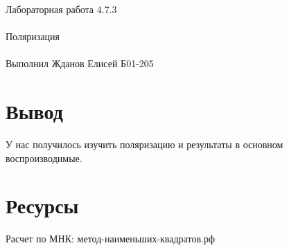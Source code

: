\documentclass{astroedu-lab}
\begin{document}
\begin{problem}{\huge Лабораторная работа 4.7.3\\\\Поляризация\\\\Выполнил Жданов Елисей Б01-205}
%
%
%
%
%
%
%
%


\section{Вывод}

У нас получилось изучить поляризацию и результаты в основном воспроизводимые.

\section{Ресурсы}

Расчет по МНК: метод-наименьших-квадратов.рф


\end{problem}
\end{document}
